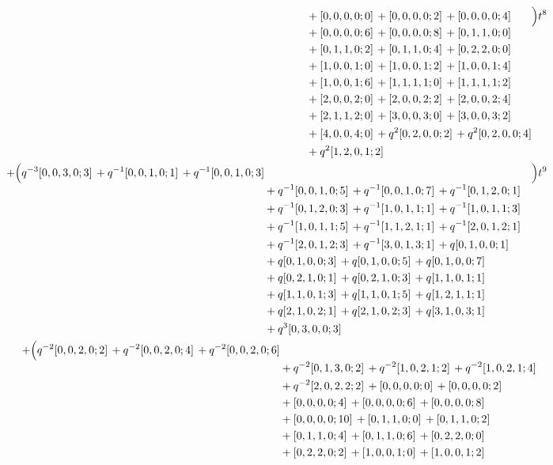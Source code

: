 \documentclass[10pt]{article}
\begin{document}
\[\begin{aligned}
\begin{aligned}[t]
  &{}+[0,0,0,0;0]\,+[0,0,0,0;2]\,+[0,0,0,0;4] \\
  &{}+[0,0,0,0;6]\,+[0,0,0,0;8]\,+[0,1,1,0;0] \\
  &{}+[0,1,1,0;2]\,+[0,1,1,0;4]\,+[0,2,2,0;0] \\
  &{}+[1,0,0,1;0]\,+[1,0,0,1;2]\,+[1,0,0,1;4] \\
  &{}+[1,0,0,1;6]\,+[1,1,1,1;0]\,+[1,1,1,1;2] \\
  &{}+[2,0,0,2;0]\,+[2,0,0,2;2]\,+[2,0,0,2;4] \\
  &{}+[2,1,1,2;0]\,+[3,0,0,3;0]\,+[3,0,0,3;2] \\
  &{}+[4,0,0,4;0]\,+q^{2}[0,2,0,0;2]\,+q^{2}[0,2,0,0;4] \\
  &{}+q^{2}[1,2,0,1;2]\end{aligned}\Bigr)t^{8} \\
  + \Bigl(\begin{aligned}[t]q^{-3}[0,0,3,0;3]\,+q^{-1}[0,0,1,0;1]\,+q^{-1}[0,0,1,0;3] \\
  &{}+q^{-1}[0,0,1,0;5]\,+q^{-1}[0,0,1,0;7]\,+q^{-1}[0,1,2,0;1] \\
  &{}+q^{-1}[0,1,2,0;3]\,+q^{-1}[1,0,1,1;1]\,+q^{-1}[1,0,1,1;3] \\
  &{}+q^{-1}[1,0,1,1;5]\,+q^{-1}[1,1,2,1;1]\,+q^{-1}[2,0,1,2;1] \\
  &{}+q^{-1}[2,0,1,2;3]\,+q^{-1}[3,0,1,3;1]\,+q[0,1,0,0;1] \\
  &{}+q[0,1,0,0;3]\,+q[0,1,0,0;5]\,+q[0,1,0,0;7] \\
  &{}+q[0,2,1,0;1]\,+q[0,2,1,0;3]\,+q[1,1,0,1;1] \\
  &{}+q[1,1,0,1;3]\,+q[1,1,0,1;5]\,+q[1,2,1,1;1] \\
  &{}+q[2,1,0,2;1]\,+q[2,1,0,2;3]\,+q[3,1,0,3;1] \\
  &{}+q^{3}[0,3,0,0;3]\end{aligned}\Bigr)t^{9} \\
  + \Bigl(\begin{aligned}[t]q^{-2}[0,0,2,0;2]\,+q^{-2}[0,0,2,0;4]\,+q^{-2}[0,0,2,0;6] \\
  &{}+q^{-2}[0,1,3,0;2]\,+q^{-2}[1,0,2,1;2]\,+q^{-2}[1,0,2,1;4] \\
  &{}+q^{-2}[2,0,2,2;2]\,+[0,0,0,0;0]\,+[0,0,0,0;2] \\
  &{}+[0,0,0,0;4]\,+[0,0,0,0;6]\,+[0,0,0,0;8] \\
  &{}+[0,0,0,0;10]\,+[0,1,1,0;0]\,+[0,1,1,0;2] \\
  &{}+[0,1,1,0;4]\,+[0,1,1,0;6]\,+[0,2,2,0;0] \\
  &{}+[0,2,2,0;2]\,+[1,0,0,1;0]\,+[1,0,0,1;2] \\

\end{aligned}
\end{aligned}\]
\end{document}
